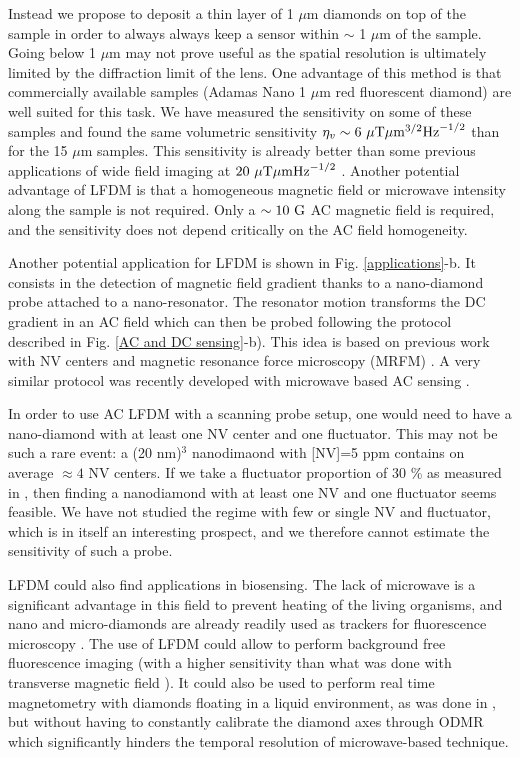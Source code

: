 \documentclass[a4paper, 11pt]{report}
\begin{document}
Instead we propose to deposit a thin layer of 1 $\mu$m diamonds on top of the sample in order to always always keep a sensor within $\sim$ 1 $\mu$m of the sample. Going below 1 $\mu$m may not prove useful as the spatial resolution is ultimately limited by the diffraction limit of the lens. One advantage of this method is that commercially available samples (Adamas Nano 1 $\mu$m red fluorescent diamond) are well suited for this task. We have measured the sensitivity on some of these samples and found the same volumetric sensitivity $\eta_v \sim 6 \ \rm{\mu T}\mu \rm{m}^{3/2} \rm{Hz}^{-1/2}$ than for the 15 $\mu$m samples. This sensitivity is already better than some previous applications of wide field imaging at $20  \ \rm{\mu T}\mu \rm{m} \rm{Hz}^{-1/2}$ \citep{glenn2017micrometer}. Another potential advantage of LFDM is that a homogeneous magnetic field or microwave intensity along the sample is not required. Only a $\sim 10 \ \rm G$ AC magnetic field is required, and the sensitivity does not depend critically on the AC field homogeneity.

Another potential application for LFDM is shown in Fig. \ref{applications}-b. It consists in the detection of magnetic field gradient thanks to a nano-diamond probe attached to a nano-resonator. The resonator motion transforms the DC gradient in an AC field which can then be probed following the protocol described in Fig. \ref{AC and DC sensing}-b). This idea is based on previous work with NV centers \citep{arcizet2011single} and magnetic resonance force microscopy (MRFM) \citep{rugar2004single}. A very similar protocol was recently developed with microwave based AC sensing \citep{huxter2022scanning}. 

In order to use AC LFDM with a scanning probe setup, one would need to have a nano-diamond with at least one NV center and one fluctuator. This may not be such a rare event: a (20 nm)$^{3}$ nanodimaond with [NV]=5 ppm contains on average $\approx 4$ NV centers. If we take a fluctuator proportion of 30 \% as measured in \citep{choi2017depolarization}, then finding a nanodiamond with at least one NV and one fluctuator  seems feasible. We have not studied the regime with few or single NV and fluctuator, which is in itself an interesting prospect, and we therefore cannot estimate the sensitivity of such a probe. 

LFDM could also find applications in biosensing. The lack of microwave is a significant advantage in this field to prevent heating of the living organisms, and nano and micro-diamonds are already readily used as trackers for fluorescence microscopy \citep{mohan2010vivo}. The use of LFDM could allow to perform background free fluorescence imaging (with a higher sensitivity than what was done with transverse magnetic field \citep{chapman2013background}). It could also be used to perform real time magnetometry with diamonds floating in a liquid environment, as was done in \citep{feng2021association}, but without having to constantly calibrate the diamond axes through ODMR which significantly hinders the temporal resolution of microwave-based technique.
\end{document}
